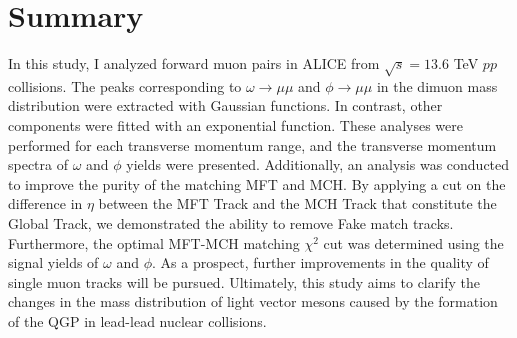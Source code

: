 \section{Summary}
    In this study, I analyzed forward muon pairs in ALICE from $\sqrt{s} = 13.6$ TeV $pp$ collisions. 
    The peaks corresponding to $\omega \rightarrow \mu\mu$ and $\phi \rightarrow \mu\mu$ in the dimuon mass distribution were extracted with Gaussian functions. In contrast, other components were fitted with an exponential function. 
    These analyses were performed for each transverse momentum range, and the transverse momentum spectra of $\omega$ and $\phi$ yields were presented. 
    Additionally, an analysis was conducted to improve the purity of the matching MFT and MCH.
    By applying a cut on the difference in $\eta$ between the MFT Track and the MCH Track that constitute the Global Track, we demonstrated the ability to remove Fake match tracks.
    Furthermore, the optimal MFT-MCH matching $\chi^2$ cut was determined using the signal yields of $\omega$ and $\phi$.
    As a prospect, further improvements in the quality of single muon tracks will be pursued. Ultimately, this study aims to clarify the changes in the mass distribution of light vector mesons caused by the formation of the QGP in lead-lead nuclear collisions.
